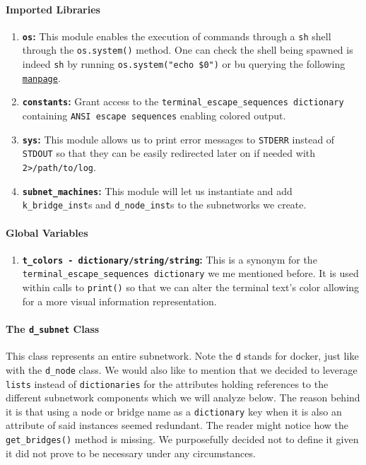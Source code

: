                 \paragraph{Imported Libraries}
                    \begin{enumerate}
                        \item \textbf{\texttt{os}:} This module enables the execution of commands through a \texttt{sh} shell through the \texttt{os.system()} method. One can check the shell being spawned is indeed \texttt{sh} by running \texttt{\allowbreak os.system("echo \$0")} or bu querying the following \href{https://linux.die.net/man/3/system}{\texttt{manpage}}.
                        \item \textbf{\texttt{constants}:} Grant access to the \texttt{\allowbreak terminal\_escape\_sequences dictionary} containing \texttt{ANSI escape sequences} enabling colored output.
                        \item \textbf{\texttt{sys}:} This module allows us to print error messages to \texttt{STDERR} instead of \texttt{STDOUT} so that they can be easily redirected later on if needed with \texttt{2>/path/to/log}.
                        \item \textbf{\texttt{subnet\_machines}:} This module will let us instantiate and add \texttt{k\_bridge\_inst}s and \texttt{d\_node\_inst}s to the subnetworks we create.
                    \end{enumerate}

                \paragraph{Global Variables}
                    \begin{enumerate}
                        \item \textbf{\texttt{\allowbreak t\_colors - dictionary/string/string}:} This is a synonym for the \texttt{\allowbreak terminal\_escape\_sequences dictionary} we me mentioned before. It is used within calls to \texttt{print()} so that we can alter the terminal text's color allowing for a more visual information representation.
                    \end{enumerate}

                \paragraph{The \texttt{d\_subnet} Class}
                    This class represents an entire subnetwork. Note the \texttt{d} stands for docker, just like with the \texttt{d\_node} class. We would also like to mention that we decided to leverage \texttt{lists} instead of \texttt{dictionaries} for the attributes holding references to the different subnetwork components which we will analyze below. The reason behind it is that using a node or bridge name as a \texttt{dictionary} key when it is also an attribute of said instances seemed redundant. The reader might notice how the \texttt{get\_bridges()} method is missing. We purposefully decided not to define it given it did not prove to be necessary under any circumstances.

